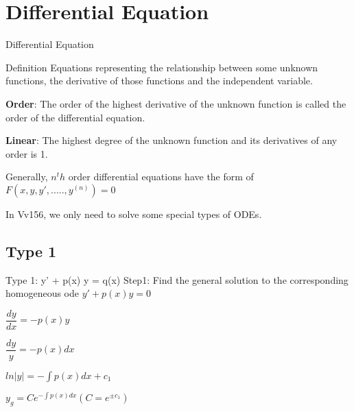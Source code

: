 \section{Differential Equation}





\begin{frame}{Differential Equation}
    \begin{block}{Definition}
        Equations representing the relationship between some unknown functions, the derivative of those functions and the independent variable.

        \textbf{Order}: The order of the highest derivative of the unknown function is called the order of the differential equation.

        \textbf{Linear}: The highest degree of the unknown function and its derivatives of any order is 1.

        Generally, $n^th$ order differential equations have the form of $F(x, y, y', ....., y^{(n)}) = 0$
    \end{block}
    In Vv156, we only need to solve some special types of ODEs.
\end{frame}


\subsection {Type 1}




\begin{frame}{Type 1:  y' + p(x) y = q(x) }
    Step1: Find the general solution to the corresponding homogeneous ode $y' + p(x)y = 0$

    \centering
    $\dfrac{dy}{dx} = -p(x) y$

    $\dfrac{dy}{y} = -p(x)dx$

    $ln|y| = -\int p(x)dx + c_1$

    $y_g = C e^{-\int p(x)dx} (C = e^{\pm c_1})$

\end{frame}





